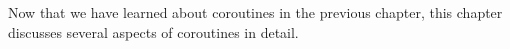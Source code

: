 Now that we have learned about coroutines in the previous chapter, this chapter discusses several aspects of coroutines in detail.
